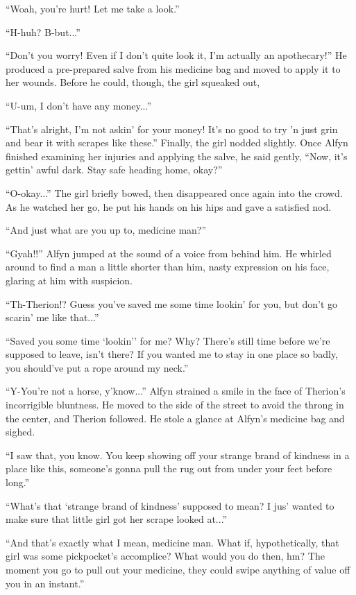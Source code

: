 ``Woah, you're hurt! Let me take a look.''

``H-huh? B-but...''

``Don't you worry! Even if I don't quite look it, I'm actually an apothecary!'' He produced a pre-prepared salve from his medicine bag and moved to apply it to her wounds. Before he could, though, the girl squeaked out,

``U-um, I don't have any money...''

``That's alright, I'm not askin' for your money! It's no good to try 'n just grin and bear it with scrapes like these.'' Finally, the girl nodded slightly. Once Alfyn finished examining her injuries and applying the salve, he said gently, ``Now, it's gettin' awful dark. Stay safe heading home, okay?''

``O-okay...'' The girl briefly bowed, then disappeared once again into the crowd. As he watched her go, he put his hands on his hips and gave a satisfied nod.

``And just what are you up to, medicine man?''

``Gyah!!'' Alfyn jumped at the sound of a voice from behind him. He whirled around to find a man a little shorter than him, nasty expression on his face, glaring at him with suspicion.

``Th-Therion!? Guess you've saved me some time lookin' for you, but don't go scarin' me like that...''

``Saved you some time `lookin'' for me? Why? There's still time before we're supposed to leave, isn't there? If you wanted me to stay in one place so badly, you should've put a rope around my neck.''

``Y-You're not a horse, y'know...'' Alfyn strained a smile in the face of Therion's incorrigible bluntness. He moved to the side of the street to avoid the throng in the center, and Therion followed. He stole a glance at Alfyn's medicine bag and sighed.

``I saw that, you know. You keep showing off your strange brand of kindness in a place like this, someone's gonna pull the rug out from under your feet before long.''

``What's that `strange brand of kindness' supposed to mean? I jus' wanted to make sure that little girl got her scrape looked at...''

``And that's exactly what I mean, medicine man. What if, hypothetically, that girl was some pickpocket's accomplice? What would you do then, hm? The moment you go to pull out your medicine, they could swipe anything of value off you in an instant.''

